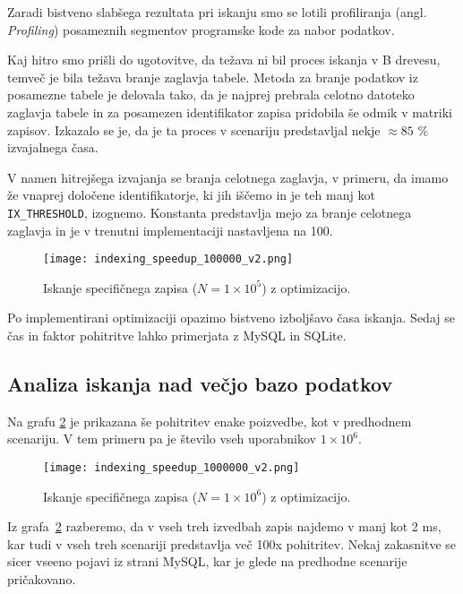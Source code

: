 \documentclass[a4paper,12pt,openright]{book}
\begin{document}
    Zaradi bistveno slabšega rezultata pri iskanju smo se lotili profiliranja (angl. \textit{Profiling}) posameznih segmentov programske kode za nabor podatkov.

    Kaj hitro smo prišli do ugotovitve, da težava ni bil proces iskanja v B drevesu, temveč je bila težava branje zaglavja tabele. Metoda za branje podatkov iz posamezne tabele je delovala tako, da je najprej prebrala celotno datoteko zaglavja tabele in za posamezen identifikator zapisa pridobila še odmik v matriki zapisov. Izkazalo se je, da je ta proces v scenariju predstavljal nekje $\approx 85$ \% izvajalnega časa.

    V namen hitrejšega izvajanja se branja celotnega zaglavja, v primeru, da imamo že vnaprej določene identifikatorje, ki jih iščemo in je teh manj kot {\tt IX\_THRESHOLD}, izognemo. Konstanta predstavlja mejo za branje celotnega zaglavja in je v trenutni implementaciji nastavljena na \num{100}.
    
    \begin{figure}[H]
        \centerline{\texttt{[image: indexing\_speedup\_100000\_v2.png]}}
        \caption{Iskanje specifičnega zapisa ($N = 1 \times 10^5$) z optimizacijo.}
        \label{idx_speedup}
    \end{figure}

    \noindent
    Po implementirani optimizaciji opazimo bistveno izboljšavo časa iskanja. Sedaj se čas in faktor pohitritve lahko primerjata z MySQL in SQLite.

    \subsection{Analiza iskanja nad večjo bazo podatkov}

    Na grafu \ref{idx_speedup_2} je prikazana še pohitritev enake poizvedbe, kot v predhodnem scenariju. V tem primeru pa je število vseh uporabnikov $1 \times 10^6$.
    
    \begin{figure}[H]
        \centerline{\texttt{[image: indexing\_speedup\_1000000\_v2.png]}}
        \caption{Iskanje specifičnega zapisa ($N = 1 \times 10^6$) z optimizacijo.}
        \label{idx_speedup_2}
    \end{figure}

    \noindent
    Iz grafa~\ref{idx_speedup_2} razberemo, da v vseh treh izvedbah zapis najdemo v manj kot 2 ms, kar tudi v vseh treh scenariji predstavlja več 100x pohitritev. Nekaj zakasnitve se sicer vseeno pojavi iz strani MySQL, kar je glede na predhodne scenarije pričakovano.
\end{document}

